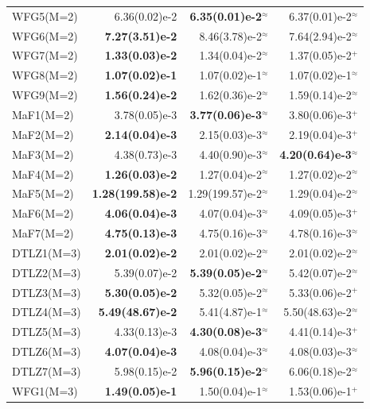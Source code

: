 \begin{table}[t]
\begin{tabular}{lrrr}
WFG5(M=2) & 6.36(0.02)e-2 & \textbf{6.35(0.01)e-2$^{\approx}$} & 6.37(0.01)e-2$^{\approx}$ \\
WFG6(M=2) & \textbf{7.27(3.51)e-2} & 8.46(3.78)e-2$^{\approx}$ & 7.64(2.94)e-2$^{\approx}$ \\
WFG7(M=2) & \textbf{1.33(0.03)e-2} & 1.34(0.04)e-2$^{\approx}$ & 1.37(0.05)e-2$^{+}$ \\
WFG8(M=2) & \textbf{1.07(0.02)e-1} & 1.07(0.02)e-1$^{\approx}$ & 1.07(0.02)e-1$^{\approx}$ \\
WFG9(M=2) & \textbf{1.56(0.24)e-2} & 1.62(0.36)e-2$^{\approx}$ & 1.59(0.14)e-2$^{\approx}$ \\
MaF1(M=2) & 3.78(0.05)e-3 & \textbf{3.77(0.06)e-3$^{\approx}$} & 3.80(0.06)e-3$^{+}$ \\
MaF2(M=2) & \textbf{2.14(0.04)e-3} & 2.15(0.03)e-3$^{\approx}$ & 2.19(0.04)e-3$^{+}$ \\
MaF3(M=2) & 4.38(0.73)e-3 & 4.40(0.90)e-3$^{\approx}$ & \textbf{4.20(0.64)e-3$^{\approx}$} \\
MaF4(M=2) & \textbf{1.26(0.03)e-2} & 1.27(0.04)e-2$^{\approx}$ & 1.27(0.02)e-2$^{\approx}$ \\
MaF5(M=2) & \textbf{1.28(199.58)e-2} & 1.29(199.57)e-2$^{\approx}$ & 1.29(0.04)e-2$^{\approx}$ \\
MaF6(M=2) & \textbf{4.06(0.04)e-3} & 4.07(0.04)e-3$^{\approx}$ & 4.09(0.05)e-3$^{+}$ \\
MaF7(M=2) & \textbf{4.75(0.13)e-3} & 4.75(0.16)e-3$^{\approx}$ & 4.78(0.16)e-3$^{\approx}$ \\
DTLZ1(M=3) & \textbf{2.01(0.02)e-2} & 2.01(0.02)e-2$^{\approx}$ & 2.01(0.02)e-2$^{\approx}$ \\
DTLZ2(M=3) & 5.39(0.07)e-2 & \textbf{5.39(0.05)e-2$^{\approx}$} & 5.42(0.07)e-2$^{\approx}$ \\
DTLZ3(M=3) & \textbf{5.30(0.05)e-2} & 5.32(0.05)e-2$^{\approx}$ & 5.33(0.06)e-2$^{+}$ \\
DTLZ4(M=3) & \textbf{5.49(48.67)e-2} & 5.41(4.87)e-1$^{\approx}$ & 5.50(48.63)e-2$^{\approx}$ \\
DTLZ5(M=3) & 4.33(0.13)e-3 & \textbf{4.30(0.08)e-3$^{\approx}$} & 4.41(0.14)e-3$^{+}$ \\
DTLZ6(M=3) & \textbf{4.07(0.04)e-3} & 4.08(0.04)e-3$^{\approx}$ & 4.08(0.03)e-3$^{\approx}$ \\
DTLZ7(M=3) & 5.98(0.15)e-2 & \textbf{5.96(0.15)e-2$^{\approx}$} & 6.06(0.18)e-2$^{\approx}$ \\
WFG1(M=3) & \textbf{1.49(0.05)e-1} & 1.50(0.04)e-1$^{\approx}$ & 1.53(0.06)e-1$^{+}$ \\

\end{tabular}
\end{table}

